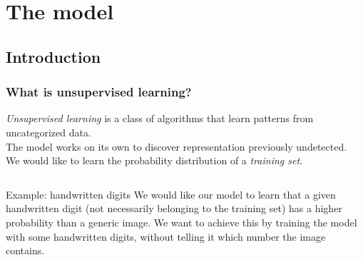 \section{The model}
\subsection{Introduction}

\begin{frame}
  \frametitle{What is unsupervised learning?}
  \emph{Unsupervised learning} is a class of algorithms that learn patterns from \alert{uncategorized data}. \\
  The model works on its own to discover representation previously undetected. \\
  \vspace{15pt}
  We would like to learn the \alert{probability distribution} of a \emph{training set}.
  \pause
  \begin{columns}
    \begin{alertblock}{Example: handwritten digits}
      We would like our model to learn that a given handwritten digit (not necessarily belonging to the training set) has a higher probability
      than a generic image. We want to achieve this by training the model with some handwritten digits, without telling it which number the image contains.
    \end{alertblock}
  \end{columns}
\end{frame}

